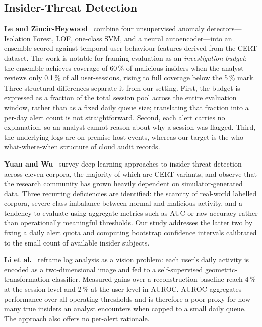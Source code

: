 
\subsection{Insider-Threat Detection}

\textbf{Le and Zincir-Heywood}~\cite{le2021ensembles} combine four unsupervised anomaly
detectors---Isolation Forest, LOF, one-class SVM, and a neural autoencoder---into an
ensemble scored against temporal user-behaviour features derived from the CERT dataset.
The work is notable for framing evaluation as an \emph{investigation budget}: the ensemble
achieves coverage of 60\,\% of malicious insiders when the analyst reviews only 0.1\,\% of all
user-sessions, rising to full coverage below the 5\,\% mark.
Three structural differences separate it from our setting. First, the budget is expressed as a
fraction of the total session pool across the entire evaluation window, rather than as a fixed
daily queue size; translating that fraction into a per-day alert count is not straightforward.
Second, each alert carries no explanation, so an analyst cannot reason about why a session was
flagged. Third, the underlying logs are on-premise host events, whereas our target is the
who-what-where-when structure of cloud audit records.

\textbf{Yuan and Wu}~\cite{yuan2021deep} survey deep-learning approaches to insider-threat
detection across eleven corpora, the majority of which are CERT variants, and observe that the
research community has grown heavily dependent on simulator-generated data.
Three recurring deficiencies are identified: the scarcity of real-world labelled corpora, severe
class imbalance between normal and malicious activity, and a tendency to evaluate using aggregate
metrics such as AUC or raw accuracy rather than operationally meaningful thresholds.
Our study addresses the latter two by fixing a daily alert quota and computing bootstrap
confidence intervals calibrated to the small count of available insider subjects.

\textbf{Li et al.}~\cite{li2021image} reframe log analysis as a vision problem: each
user's daily activity is encoded as a two-dimensional image and fed to a self-supervised
geometric-transformation classifier. Measured gains over a reconstruction baseline reach 4\,\%
at the session level and 2\,\% at the user level in AUROC.
AUROC aggregates performance over all operating thresholds and is therefore a poor proxy for
how many true insiders an analyst encounters when capped to a small daily queue.
The approach also offers no per-alert rationale.

